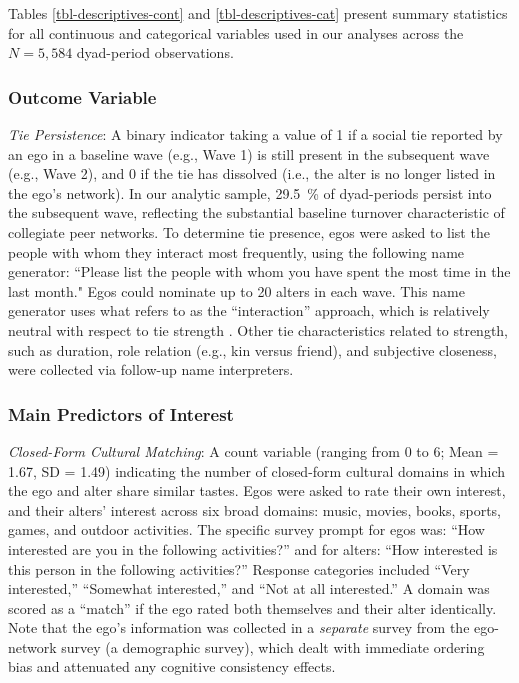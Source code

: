 \documentclass[
  letterpaper,
  DIV=11,
  numbers=noendperiod]{scrartcl}
\def\percent{\%}%
\begin{document}
Tables \ref{tbl-descriptives-cont} and \ref{tbl-descriptives-cat} present summary statistics for all continuous and categorical variables used in our analyses across the $N = 5,584$ dyad-period observations.





\subsubsection{Outcome Variable}
\emph{Tie Persistence}: A binary indicator taking a value of 1 if a social tie reported by an ego in a baseline wave (e.g., Wave 1) is still present in the subsequent wave (e.g., Wave 2), and 0 if the tie has dissolved (i.e., the alter is no longer listed in the ego's network). In our analytic sample, \SI{29.5}{\percent} of dyad-periods persist into the subsequent wave, reflecting the substantial baseline turnover characteristic of collegiate peer networks. To determine tie presence, egos were asked to list the people with whom they interact most frequently, using the following name generator: ``Please list the people with whom you have spent the most time in the last month." Egos could nominate up to 20 alters in each wave. This name generator uses what \citep{marin2007simplifying-74e} refers to as the ``interaction'' approach, which is relatively neutral with respect to tie strength \citep{laumann1989boundary-0af}. Other tie characteristics related to strength, such as duration, role relation (e.g., kin versus friend), and subjective closeness, were collected via follow-up name interpreters. 

\subsubsection{Main Predictors of Interest} 

\emph{Closed-Form Cultural Matching}: A count variable (ranging from 0 to 6; Mean = 1.67, SD = 1.49) indicating the number of closed-form cultural domains in which the ego and alter share similar tastes. Egos were asked to rate their own interest, and their alters' interest across six broad domains: music, movies, books, sports, games, and outdoor activities. The specific survey prompt for egos was: ``How interested are you in the following activities?'' and for alters: ``How interested is this person in the following activities?'' Response categories included ``Very interested,'' ``Somewhat interested,'' and ``Not at all interested.'' A domain was scored as a ``match'' if the ego rated both themselves and their alter identically. Note that the ego's information was collected in a \textit{separate} survey from the ego-network survey (a demographic survey), which dealt with immediate ordering bias and attenuated any cognitive consistency effects.
\end{document}
